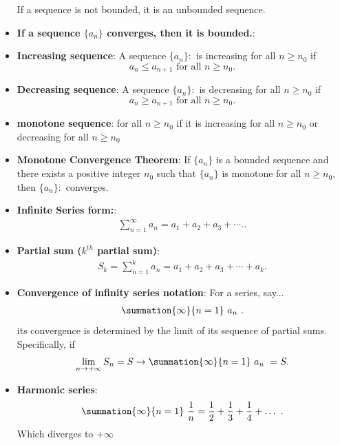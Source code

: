 \documentclass{report}
\begin{document}
\begin{itemize}
        If a sequence is not bounded, it is an unbounded sequence.
    \item \textbf{If a sequence  $\{a_{n}\} $ converges, then it is bounded.}:
    \item \textbf{Increasing sequence}: A sequence \( \{a_n\}: \) is increasing for all \( n \geq n_0 \) if
        \[ a_n \leq a_{n+1} \text{ for all } n \geq n_0. \]
    \item \textbf{Decreasing sequence}: A sequence \( \{a_n\}: \) is decreasing for all \( n \geq n_0 \) if
        \[ a_n \geq a_{n+1} \text{ for all } n \geq n_0. \]
    \item \textbf{monotone sequence}: for all \( n \geq n_0 \) if it is increasing for all \( n \geq n_0 \) or decreasing for all \( n \geq n_0 \)
    \item \textbf{Monotone Convergence Theorem}:         If \( \{a_n\} \) is a bounded sequence and there exists a positive integer \( n_0 \) such that \( \{a_n\} \) is monotone for all \( n \geq n_0 \), then \( \{a_n\}: \) converges.
    \item \textbf{Infinite Series form:}:
        \begin{align*}
            \sum_{n=1}^{\infty} a_n = a_1 + a_2 + a_3 + \cdots.
        .\end{align*}
    \item \textbf{Partial sum ($k^{th}$ partial sum)}:
        \begin{align*}
            S_k = \sum_{n=1}^{k} a_n = a_1 + a_2 + a_3 + \cdots + a_k
        .\end{align*}
    \item \textbf{Convergence of infinity series notation}:
        \bigbreak \noindent 
        For a series, say...
        \begin{align*}
            \summation{\infty}{n=1}\ a_{n}\ 
        .\end{align*}
        its convergence is determined by the limit of its sequence of partial sums. Specifically, if
        \begin{align*}
            \lim\limits_{n \to +\infty}{S_{n}} = S \rightarrow \summation{\infty}{n=1}\ a_{n}\ = S 
        .\end{align*}
    \item \textbf{Harmonic series}:
        \begin{align*}
            \summation{\infty}{n=1}\ \frac{1}{n}  =  \frac{1}{2} + \frac{1}{3} + \frac{1}{4} + \ldots\ 
        .\end{align*}
        Which diverges to $+\infty$

\end{itemize}
\end{document}
